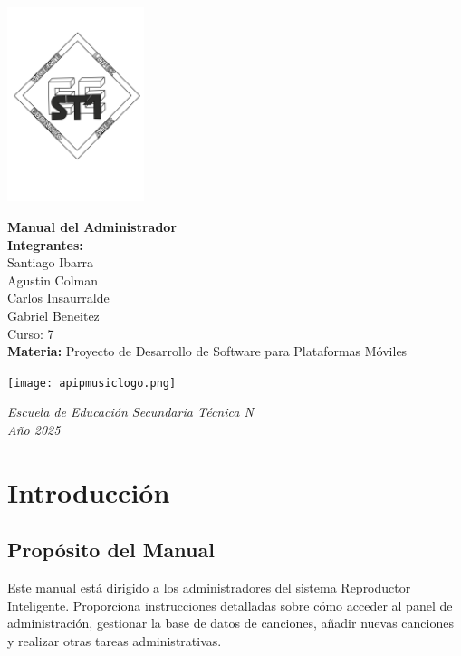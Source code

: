 \documentclass[a4paper,12pt]{article}
\begin{document}
\begin{flushright}
    \includegraphics[width=4cm]{LOGO-EEST1.png}
\end{flushright}

\vspace*{2cm}

\begin{center}
    {\LARGE\bfseries Manual del Administrador} \\[1.5cm]
    \textbf{Integrantes:} \\[0.3cm]
    Santiago Ibarra \\[0.2cm]
    Agustin Colman \\[0.2cm]
    Carlos Insaurralde \\[0.2cm]
    Gabriel Beneitez \\[1.2cm]
    Curso: 7 \\
    \vspace{0.5cm}
    \textbf{Materia:} Proyecto de Desarrollo de Software para Plataformas Móviles
    
    \vspace{0.7cm}
    \texttt{[image: apipmusiclogo.png]}\\[0.5cm]
\end{center}

\vfill

\begin{center}
    \textit{Escuela de Educación Secundaria Técnica N} \\
    \textit{Año 2025}
\end{center}

\thispagestyle{empty}
\newpage

\tableofcontents
\newpage

\section{Introducción}
\subsection{Propósito del Manual}
Este manual está dirigido a los administradores del sistema Reproductor Inteligente. Proporciona instrucciones detalladas sobre cómo acceder al panel de administración, gestionar la base de datos de canciones, añadir nuevas canciones y realizar otras tareas administrativas.
\end{document}
